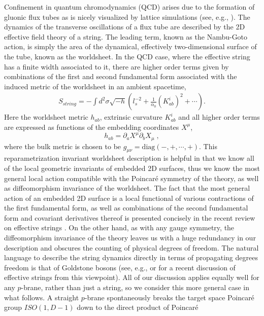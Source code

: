 \documentclass[%
 reprint,
 amsmath,amssymb,
 aps,
]{revtex4-1}
\begin{document}
Confinement in quantum chromodynamics (QCD) arises due to the formation of
gluonic flux tubes as is nicely visualized by lattice simulations (see, e.g., \cite{Teper:2009uf}).
The dynamics of the transverse oscillations of a flux tube are
described by the 2D effective field theory of a string. The leading term, known as the
Nambu-Goto action, is simply the area of the dynamical, effectively two-dimensional surface
of the tube, known as the worldsheet. In the QCD case, where the effective string has a finite
width associated to it, there are higher order terms given by combinations of the first
and second fundamental form associated with the induced metric of the worldsheet in an
ambient spacetime,
\begin{eqnarray}
\label{diffaction}
    S_{string} = - \int d^2 \sigma \sqrt{- h} \left(
    l_s^{-2} + \frac{1}{\alpha_0} (K^i_{ab})^2 + \cdots \right).
\end{eqnarray}
Here the worldsheet metric $h_{ab}$, extrinsic curvature $K^i_{ab}$ and all higher order terms are expressed as functions of the embedding coordinates $X^\mu$,
\[
h_{ab}=\partial_a X^\mu\partial_bX_\mu\;,
\]
where the bulk metric is chosen to be $g_{\mu \nu} = \mathrm{diag}(-,+,\cdots,+)$.
This reparametrization invariant worldsheet description is helpful in that we know all
of the local geometric invariants of embedded 2D surfaces, thus we know the most general
local action compatible with the Poincar\'e symmetry of the theory, as
well as diffeomorphism invariance of the worldsheet. The fact that the most general action of an embedded 2D surface is a local functional of various
contractions of the first fundamental form, as well as combinations of the second fundamental form and covariant derivatives thereof is presented concisely
in the recent review on effective strings \cite{Aharony:2013ipa}. On the other hand, as with any gauge symmetry, the
diffeomorphism invariance of the theory leaves us with a huge redundancy in our description and obscures the counting of physical degrees of freedom.
The natural language to describe the string dynamics directly in terms of propagating degrees freedom  is that of Goldstone bosons
(see, e.g., \cite{Dubovsky:2012sh} or \cite{Aharony:2013ipa} for a recent discussion of effective strings from this viewpoint). All of our discussion
applies equally well for any $p$-brane, rather than just a string, so we consider this more general case in what follows.
A  straight $p$-brane spontaneously breaks the target space Poincar\'e group $ISO(1,D-1)$ down to the direct product of Poincar\'e
\end{document}
